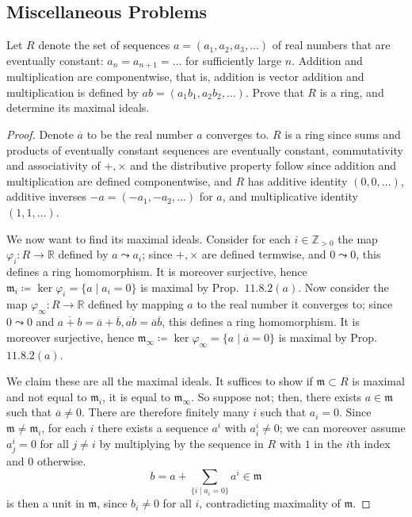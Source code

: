 \documentclass[12pt]{article}
\theoremstyle{remark}
\begin{document}
\subsection{Miscellaneous Problems}
\setcounter{subsubsection}{2}
\begin{problem}
  Let $R$ denote the set of sequences $a = (a_1,a_2,a_3,\ldots)$ of real numbers that are eventually constant: $a_n = a_{n+1} = \ldots$ for sufficiently large $n$. Addition and multiplication are componentwise, that is, addition is vector addition and multiplication is defined by $ab = (a_1b_1,a_2b_2,\ldots)$. Prove that $R$ is a ring, and determine its maximal ideals.
\end{problem}
\begin{proof}
  Denote $\overline{a}$ to be the real number $a$ converges to. $R$ is a ring since sums and products of eventually constant sequences are eventually constant, commutativity and associativity of $+,\times$ and the distributive property follow since addition and multiplication are defined componentwise, and $R$ has additive identity $(0, 0, \ldots)$, additive inverses $-a = (-a_1, -a_2, \ldots)$ for $a$, and multiplicative identity $(1,1,\ldots)$.
  \par We now want to find its maximal ideals. Consider for each $i \in \mathbb{Z}_{>0}$ the map $\varphi_i \colon R \to \mathbb{R}$ defined by $a \leadsto a_i$; since $+,\times$ are defined termwise, and $0 \leadsto 0$, this defines a ring homomorphism. It is moreover surjective, hence $\mathfrak{m}_i \coloneqq \ker\varphi_i = \{a \mid a_i = 0\}$ is maximal by Prop.~$11.8.2(a)$. Now consider the map $\varphi_\infty\colon R \to \mathbb{R}$ defined by mapping $a$ to the real number it converges to; since $0 \leadsto 0$ and $\overline{a+b} = \overline{a}+\overline{b},\overline{ab} = \overline{a}\overline{b}$, this defines a ring homomorphism. It is moreover surjective, hence $\mathfrak{m}_\infty \coloneqq \ker\varphi_\infty = \{a \mid \overline{a} = 0\}$ is maximal by Prop.~$11.8.2(a)$.
  \par We claim these are all the maximal ideals. It suffices to show if $\mathfrak{m} \subset R$ is maximal and not equal to $\mathfrak{m}_i$, it is equal to $\mathfrak{m}_\infty$. So suppose not; then, there exists $a \in \mathfrak{m}$ such that $\overline{a} \ne 0$. There are therefore finitely many $i$ such that $a_i = 0$. Since $\mathfrak{m} \ne \mathfrak{m}_i$, for each $i$ there exists a sequence $a^i$ with $a^i_i \ne 0$; we can moreover assume $a^i_j = 0$ for all $j \ne i$ by multiplying by the sequence in $R$ with $1$ in the $i$th index and $0$ otherwise.
  \begin{equation*}
    b = a + \sum_{\{i \mid a_i = 0\}} a^i \in \mathfrak{m}
  \end{equation*}
  is then a unit in $\mathfrak{m}$, since $b_i \ne 0$ for all $i$, contradicting maximality of $\mathfrak{m}$.
\end{proof}
\end{document}
